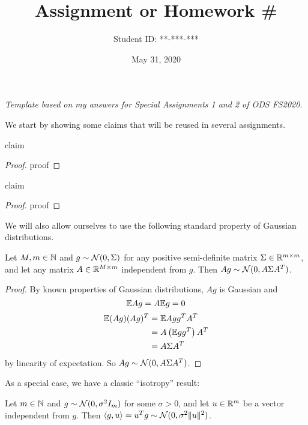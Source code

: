 \documentclass{article}
\title{Assignment or Homework \#}
\date{May 31, 2020}
\author{Student ID: **-***-***}
\numberwithin{equation}{subsection}
\begin{document}
\maketitle

\begin{center}
	\textit{Template based on my answers for Special Assignments 1 and 2 of ODS FS2020.}
\end{center}

We start by showing some claims that will be reused in several assignments.

\begin{claim} \label{claim:dummy_claim}
	claim
\end{claim}

\begin{proof}
	proof
\end{proof}

\begin{claim} 
	claim
\end{claim}

\begin{proof}
	proof
\end{proof}

We will also allow ourselves to use the following standard property of Gaussian distributions.
\begin{fact}
	Let $M, m \in \mathbb{N}$ and $g \sim \mathcal{N}(0, \Sigma)$ for any positive semi-definite matrix $\Sigma \in \mathbb{R}^{m \times m}$, and let any matrix $A \in \mathbb{R}^{M \times m}$ independent from $g$.
	Then $A g \sim \mathcal{N}(0, A \Sigma A^T)$.
\end{fact}

\begin{proof}
    By known properties of Gaussian distributions, $A g$ is Gaussian and
    \begin{equation}
        \mathbb{E} A g = A \mathbb{E} g = 0
    \end{equation}
    \begin{align}
        \mathbb{E} (A g) (A g)^T &= \mathbb{E} A g g^T A^T \\
        &= A \left( \mathbb{E} g g^T \right) A^T \\
        &= A \Sigma A^T
    \end{align}
    by linearity of expectation. So $A g \sim \mathcal{N}(0, A \Sigma A^T)$.
\end{proof}

As a special case, we have a classic ``isotropy'' result:
\begin{fact}
	Let $m \in \mathbb{N}$ and $g \sim \mathcal{N}(0, \sigma^2 I_m)$ for some $\sigma > 0$, and let $u \in \mathbb{R}^m$ be a vector independent from $g$. Then $\langle g, u \rangle = u^T g \sim \mathcal{N}(0, \sigma^2 \|u\|^2)$.
\end{fact}
\end{document}
